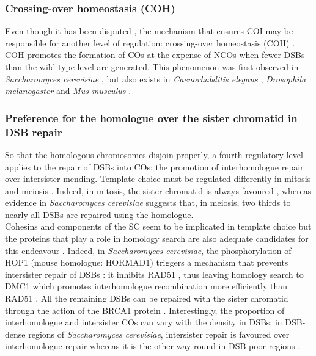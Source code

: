 \subsubsection{Crossing-over homeostasis (COH)}
Even though it has been disputed \citep{shinohara2008crossover}, the mechanism that ensures COI may be responsible for another level of regulation: crossing-over homeostasis (COH) \citep[reviewed in \citealp{youds2011choice}]{joshi2009pch2,zanders2009pch2delta}.
COH promotes the formation of COs at the expense of NCOs when fewer DSBs than the wild-type level are generated.
This phenomenon was first observed in \textit{Saccharomyces cerevisiae} \citep{martini2006crossover,chen2008global}, but also exists in \textit{Caenorhabditis elegans} \citep{yokoo2012cosa1,globus2012joy}, \textit{Drosophila melanogaster} \citep{mehrotra2006temporal} and \textit{Mus musculus} \citep{cole2012homeostatic}.



\subsubsection{Preference for the homologue over the sister chromatid in DSB repair}
So that the homologous chromosomes disjoin properly, a fourth regulatory level applies to the repair of DSBs into COs: the promotion of interhomologue repair over intersister mending.
Template choice must be regulated differently in mitosis and meiosis \citep{andersen2010meiotic}.
Indeed, in mitosis, the sister chromatid is always favoured \citep{kadyk1992sister,bzymek2010double}, whereas evidence in \textit{Saccharomyces cerevisiae} suggests that, in meiosis, two thirds \citep{goldfarb2010frequent} to nearly all \citep{pan2011hierarchical} DSBs are repaired using the homologue.\\

Cohesins and components of the SC seem to be implicated in template choice \citep[reviewed in \citealp{pradillo2011template}]{couteau2004component,kim2010sister} but the proteins that play a role in homology search are also adequate candidates for this endeavour \citep[reviewed in][]{youds2011choice}.
Indeed, in \textit{Saccharomyces cerevisiae}, the phosphorylation of HOP1 (mouse homologue: HORMAD1) triggers a mechanism that prevents intersister repair of DSBs \citep{niu2005partner}: it inhibits RAD51 \citep{niu2009regulation}, thus leaving homology search to DMC1 which promotes interhomologue recombination more efficiently than RAD51 \citep{schwacha1997interhomolog}.
All the remaining DSBs can be repaired with the sister chromatid through the action of the BRCA1 protein \citep{adamo2008brc}.
Interestingly, the proportion of interhomologue and intersister COs can vary with the density in DSBs: in DSB-dense regions of \textit{Saccharomyces cerevisiae}, intersister repair is favoured over interhomologue repair whereas it is the other way round in DSB-poor regions \citep{hyppa2010crossover}.\\

